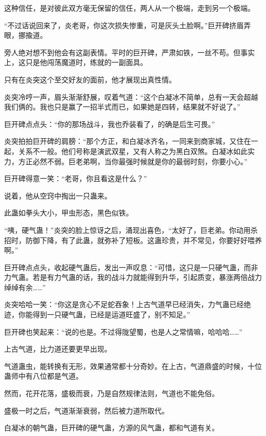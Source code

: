 \begin{this_body}
这种信任，是对彼此双方毫无保留的信任，两人从一个极端，走到另一个极端。

“不过话说回来了，炎老哥，你这次损失惨重，可是灰头土脸啊。”巨开碑挤眉弄眼，挪揄道。

旁人绝对想不到他会有这副表情。平时的巨开碑，严肃如铁，一丝不苟。但事实上，这只是他闯荡魔道时，练就的一副面具。

只有在炎突这个至交好友的面前，他才展现出真性情。

炎突冷哼一声，眉头渐渐舒展，叹着气道：“这个白凝冰不简单，总有一天会超越我们俩的。我也只是赢了一招半式而已，如果她是四转，结果就不好说了。”

巨开碑点点头：“你的那场战斗，我也乔装看了，的确是后生可畏。”

炎突拍拍巨开碑的肩膀：“那个方正，和白凝冰齐名，一同来到商家城，又住在一起，关系不一般。他们号称是演武双星，又有人称之为黑白双煞。白凝冰如此实力，方正必然不弱。巨老弟啊，当你最强时候就是你的最弱时刻，你要小心。”

巨开碑得意一笑：“老哥，你且看这是什么？”

说着，他从空窍中掏出一只蛊来。

此蛊如拳头大小，甲虫形态，黑色似铁。

“咦，硬气蛊！”炎突的脸上惊讶之后，涌现出喜色，“太好了，巨老弟。你动用杀招时，防御下降，有了此蛊，就弥补了短板。这蛊珍贵，并不常见，你要好好喂养啊。”

巨开碑点点头，收起硬气蛊后，发出一声叹息：“可惜，这只是一只硬气蛊，而非力气蛊。若是有力气蛊的话，我的战斗力就能得到升华，引起质变，暴涨两倍战力绰绰有余……”

炎突哈哈一笑：“你这是贪心不足蛇吞象！上古气道早已经消失，力气蛊已经绝迹，你能得到一只硬气蛊，已经是运道旺盛了，别不知足。”

巨开碑也笑起来：“说的也是。不过得陇望蜀，也是人之常情嘛，哈哈哈……”

上古气道，比力道还要更早出现。

气道蛊虫，能转换有无形，效果通常都十分奇妙。在上古，气道鼎盛的时候，十位蛊师中有八位都是气道。

然而，花开花落，盛极而衰，乃是自然规律法则，气道也不能免俗。

盛极一时之后，气道渐渐衰弱，然后被力道所取代。

白凝冰的朝气蛊，巨开碑的硬气蛊，方源的风气蛊，都和气道有关。

\end{this_body}

